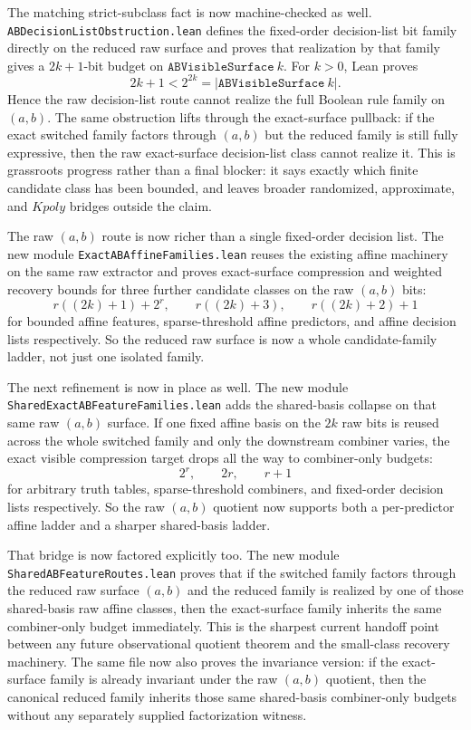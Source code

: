 \documentclass[11pt]{article}
\theoremstyle{remark}
\begin{document}
The matching strict-subclass fact is now machine-checked as well.
\texttt{ABDecisionListObstruction.lean} defines the fixed-order decision-list
bit family directly on the reduced raw surface and proves that realization by
that family gives a \(2k+1\)-bit budget on \(\texttt{ABVisibleSurface}\ k\).
For \(k>0\), Lean proves
\[
  2k+1 < 2^{2k} = |\texttt{ABVisibleSurface}\ k|.
\]
Hence the raw decision-list route cannot realize the full Boolean rule family
on \((a,b)\).  The same obstruction lifts through the exact-surface pullback:
if the exact switched family factors through \((a,b)\) but the reduced family is
still fully expressive, then the raw exact-surface decision-list class cannot
realize it.  This is grassroots progress rather than a final blocker: it says
exactly which finite candidate class has been bounded, and leaves broader
randomized, approximate, and \(Kpoly\) bridges outside the claim.

The raw \((a,b)\) route is now richer than a single fixed-order decision list.
The new module \texttt{ExactABAffineFamilies.lean} reuses the existing affine
machinery on the same raw extractor and proves exact-surface compression and
weighted recovery bounds for three further candidate classes on the raw
\((a,b)\) bits:
\[
  r((2k)+1)+2^r, \qquad r((2k)+3), \qquad r((2k)+2)+1
\]
for bounded affine features, sparse-threshold affine predictors, and affine
decision lists respectively.  So the reduced raw surface is now a whole
candidate-family ladder, not just one isolated family.

The next refinement is now in place as well.  The new module
\texttt{SharedExactABFeatureFamilies.lean} adds the shared-basis collapse on
that same raw \((a,b)\) surface.  If one fixed affine basis on the \(2k\) raw
bits is reused across the whole switched family and only the downstream
combiner varies, the exact visible compression target drops all the way to
combiner-only budgets:
\[
  2^r, \qquad 2r, \qquad r+1
\]
for arbitrary truth tables, sparse-threshold combiners, and fixed-order
decision lists respectively.  So the raw \((a,b)\) quotient now supports both a
per-predictor affine ladder and a sharper shared-basis ladder.

That bridge is now factored explicitly too.  The new module
\texttt{SharedABFeatureRoutes.lean} proves that if the switched family factors
through the reduced raw surface \((a,b)\) and the reduced family is realized by
one of those shared-basis raw affine classes, then the exact-surface family
inherits the same combiner-only budget immediately.  This is the sharpest
current handoff point between any future observational quotient theorem and the
small-class recovery machinery.  The same file now also proves the invariance
version: if the exact-surface family is already invariant under the raw
\((a,b)\) quotient, then the canonical reduced family inherits those same
shared-basis combiner-only budgets without any separately supplied
factorization witness.
\end{document}
